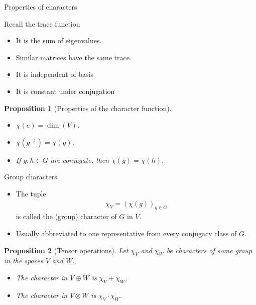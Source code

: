 \documentclass[10pt]{beamer}
\newtheorem{proposition}{Proposition}[theorem]
\begin{document}
	\begin{frame}{Properties of characters}
		\begin{block}{Recall the trace function}
			\begin{itemize}
				\item It is the sum of eigenvalues.
				
				\item Similar matrices have the same trace.
				
				\item It is independent of basis
				
				\item It is constant under conjugation
			\end{itemize}
		\end{block}\pause
		\begin{proposition}[Properties of the character function]
			\begin{itemize}
				
				\item $\chi(e) = \dim(V)$.
				
				\item $\chi(g^{-1}) = \overline{\chi(g)}$.
				
				\item If $g,h \in G$ are conjugate, then $\chi(g) = \chi(h)$.
				
			\end{itemize}
		\end{proposition}
	\end{frame}
	\begin{frame}{Group characters}
		\begin{definition}
			\begin{itemize}
				\item The tuple
			\begin{align*}
				\chi_V = \left(\chi(g)\right)_{g \in G}
			\end{align*}
			is called the \alert{(group) character} of $G$ in $V$.\pause
			
				\item Usually abbreviated to one representative from every conjugacy class of $G$.
			\end{itemize}
		\end{definition}\pause
		
		\begin{proposition}[Tensor operations]
			Let $\chi_V$ and $\chi_W$ be characters of some group in the spaces $V$ and $W$.\pause
			
			\begin{itemize}
				\item The character in $V \oplus W$ is $\chi_V + \chi_W$,\pause
				\item The character in $V \otimes W$ is $\chi_V \cdot \chi_W$.
			\end{itemize}
		\end{proposition}
	\end{frame}
\end{document}
